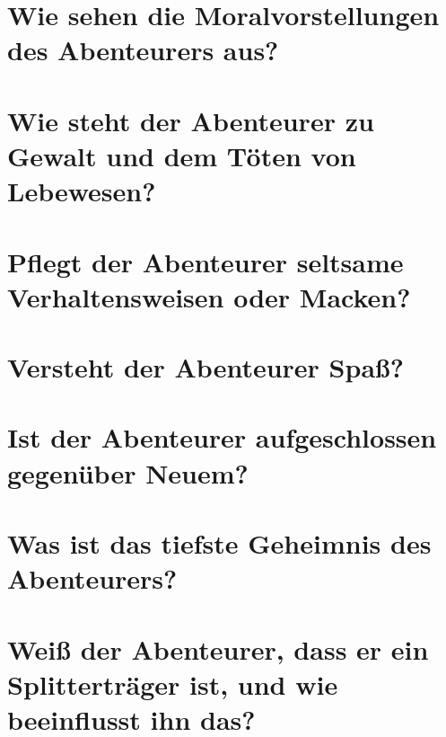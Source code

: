 \documentclass{article}
\begin{document}
	\section[Moral]{Wie sehen die Moralvorstellungen des Abenteurers aus?}
	
	\section[Frustrationstoleranz]{Wie steht der Abenteurer zu Gewalt und dem Töten von Lebewesen?}

	\section[Macken]{Pflegt der Abenteurer seltsame Verhaltensweisen oder Macken?}
	
	\section[Humor]{Versteht der Abenteurer Spaß?}
	
	\section[Aufgeschlossenheit]{Ist der Abenteurer aufgeschlossen gegenüber Neuem?}
	
	\section[Top Secret]{Was ist das tiefste Geheimnis des Abenteurers?}
	
	\section[Splitter]{Weiß der Abenteurer, dass er ein Splitterträger ist, und wie beeinflusst ihn das?}
\end{document}
